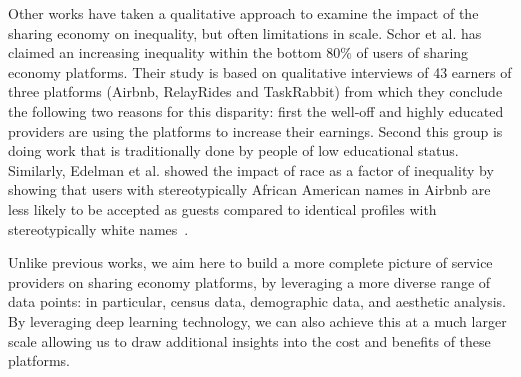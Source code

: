 Other works have taken a qualitative approach to examine the impact of the sharing economy on inequality, but often limitations in scale. Schor et al. \cite{schor2017does} has claimed an increasing inequality within the bottom 80\% of users of sharing economy platforms. Their study is based on qualitative interviews of 43 earners of three platforms (Airbnb, RelayRides and TaskRabbit) from which they conclude the following two reasons for this disparity: first the well-off and highly educated providers are using the platforms to increase their earnings. Second this group is doing work that is traditionally done by people of low educational status. Similarly, Edelman et al.  showed the impact of race as a factor of inequality by showing that users with stereotypically African American names in Airbnb are less likely to be accepted as guests compared to identical profiles with stereotypically white names~\cite{edelman2017racial}. 



Unlike previous works, we aim here to build a more complete picture of service providers on sharing economy platforms, by leveraging a more diverse range of data points: in particular, census data, demographic data, and aesthetic analysis. By leveraging deep learning technology, we can also achieve this at a much larger scale allowing us to draw additional insights into the cost and benefits of these platforms. 

